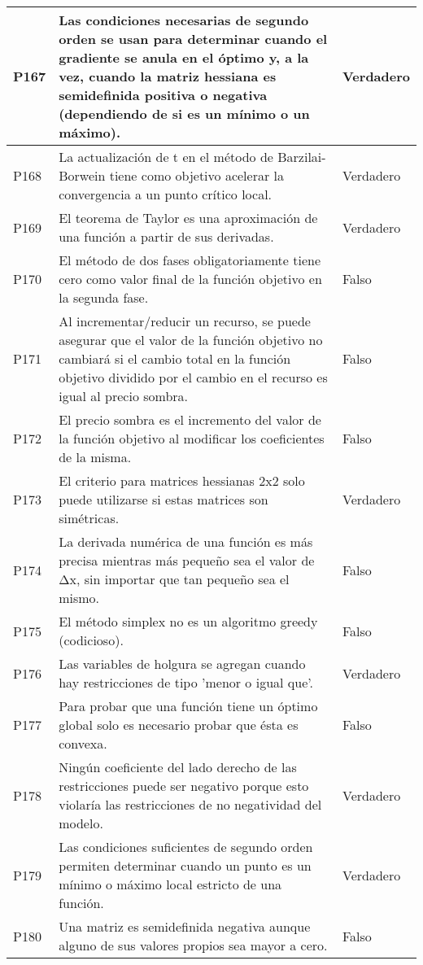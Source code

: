 \documentclass{article}
\begin{document}
\begin{longtable}{|>{\centering\arraybackslash}p{1.5cm}|>{\raggedright\arraybackslash}p{14cm}|>{\centering\arraybackslash}p{2cm}|}
\hline
P167 & Las condiciones necesarias de segundo orden se usan para determinar cuando el gradiente se anula en el óptimo y, a la vez, cuando la matriz hessiana es semidefinida positiva o negativa (dependiendo de si es un mínimo o un máximo). & Verdadero \\
\hline
P168 & La actualización de t en el método de Barzilai-Borwein tiene como objetivo acelerar la convergencia a un punto crítico local. & Verdadero \\
\hline
P169 & El teorema de Taylor es una aproximación de una función a partir de sus derivadas. & Verdadero \\
\hline
P170 & El método de dos fases obligatoriamente tiene cero como valor final de la función objetivo en la segunda fase. & Falso \\
\hline
P171 & Al incrementar/reducir un recurso, se puede asegurar que el valor de la función objetivo no cambiará si el cambio total en la función objetivo dividido por el cambio en el recurso es igual al precio sombra. & Falso \\
\hline
P172 & El precio sombra es el incremento del valor de la función objetivo al modificar los coeficientes de la misma. & Falso \\
\hline
P173 & El criterio para matrices hessianas 2x2 solo puede utilizarse si estas matrices son simétricas. & Verdadero \\
\hline
P174 & La derivada numérica de una función es más precisa mientras más pequeño sea el valor de Δx, sin importar que tan pequeño sea el mismo. & Falso \\
\hline
P175 & El método simplex no es un algoritmo greedy (codicioso). & Falso \\
\hline
P176 & Las variables de holgura se agregan cuando hay restricciones de tipo 'menor o igual que'. & Verdadero \\
\hline
P177 & Para probar que una función tiene un óptimo global solo es necesario probar que ésta es convexa. & Falso \\
\hline
P178 & Ningún coeficiente del lado derecho de las restricciones puede ser negativo porque esto violaría las restricciones de no negatividad del modelo. & Verdadero \\
\hline
P179 & Las condiciones suficientes de segundo orden permiten determinar cuando un punto es un mínimo o máximo local estricto de una función. & Verdadero \\
\hline
P180 & Una matriz es semidefinida negativa aunque alguno de sus valores propios sea mayor a cero. & Falso \\

\end{longtable}
\end{document}
